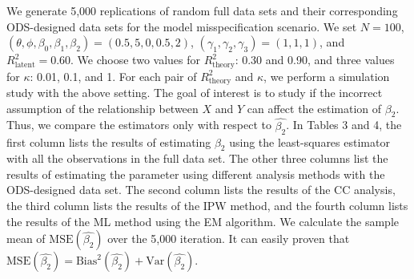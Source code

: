 \documentclass[
  12pt,
]{article}
\begin{document}
We generate 5,000 replications of random full data sets and their
corresponding ODS-designed data sets for the model misspecification
scenario. We set \(N = 100\),
\((\theta, \phi, \beta_0, \beta_1, \beta_2) = (0.5, 5, 0, 0.5, 2)\),
\((\gamma_1, \gamma_2, \gamma_3) = (1, 1, 1)\), and
\(R_{\mathrm{latent}}^2 = 0.60\). We choose two values for
\(R_{\mathrm{theory}}^2\): 0.30 and 0.90, and three values for
\(\kappa\): 0.01, 0.1, and 1. For each pair of \(R_{\mathrm{theory}}^2\)
and \(\kappa\), we perform a simulation study with the above setting.
The goal of interest is to study if the incorrect assumption of the
relationship between \(X\) and \(Y\) can affect the estimation of
\(\beta_2\). Thus, we compare the estimators only with respect to
\(\hat{\beta_2}\). In Tables 3 and 4, the first column lists the results
of estimating \(\beta_2\) using the least-squares estimator with all the
observations in the full data set. The other three columns list the
results of estimating the parameter using different analysis methods
with the ODS-designed data set. The second column lists the results of
the CC analysis, the third column lists the results of the IPW method,
and the fourth column lists the results of the ML method using the EM
algorithm. We calculate the sample mean of
\(\mathrm{MSE}(\hat{\beta_2})\) over the 5,000 iteration. It can easily
proven that
\(\mathrm{MSE}(\hat{\beta_2}) = \mathrm{Bias}^{2}(\hat{\beta_2}) + \mathrm{Var}(\hat{\beta_2})\).
\end{document}
